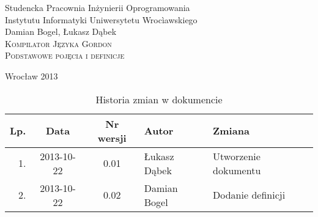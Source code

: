 \documentclass{documentation}
\begin{document}
\begin{titlepage}
\begin{center}
Studencka Pracownia Inżynierii Oprogramowania\\
Instytutu Informatyki Uniwersytetu Wrocìawskiego\\[6cm]

Damian Bogel, Łukasz Dąbek\\[1cm]
\textsc{\LARGE Kompilator Języka Gordon}\\[0.5cm]
\textsc{\large Podstawowe pojęcia i definicje}

\vfill
Wrocław 2013 \\[2.5cm]

\end{center}
\end{titlepage}

\newpage
\begin{table}
	\centering
	\caption{Historia zmian w dokumencie}
		\begin{tabular}{|r|c|c|l|l|}
		\hline
		Lp.  & Data       & Nr wersji & Autor                 & Zmiana \\ \hline
		1.   & 2013-10-22 & 0.01 & Łukasz Dąbek & Utworzenie dokumentu \\ \hline
        2.   & 2013-10-22 & 0.02 & Damian Bogel & Dodanie definicji \\ \hline
	\end{tabular}
\end{table}
\newpage

\tableofcontents
\setcounter{page}{2}

\newpage
\end{document}
